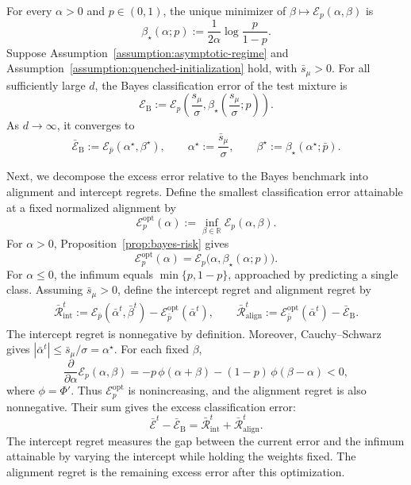 \begin{proposition}
\label{prop:bayes-risk}
For every $\alpha>0$ and $p\in(0,1)$, the unique minimizer of
$\beta\mapsto\mathcal E_p(\alpha,\beta)$ is
\begin{equation}
    \beta_\star(\alpha;p)
    :=
    \frac{1}{2\alpha}\log\frac{p}{1-p}.
    \label{eq:classification-optimal-normalized-intercept}
\end{equation}
Suppose
Assumption~\ref{assumption:asymptotic-regime}
and Assumption~\ref{assumption:quenched-initialization} hold,
with $\bar s_\mu>0$.
For all sufficiently large $d$, the Bayes classification
error of the test mixture is
\[
    \mathcal E_{\mathrm B}
    :=
    \mathcal E_p\left(
        \frac{s_\mu}{\sigma},
        \beta_\star\left(\frac{s_\mu}{\sigma};p\right)
    \right).
\]
As $d\to\infty$, it converges to
\begin{equation}
    \bar{\mathcal E}_{\mathrm B}
    :=
    \mathcal E_{\bar p}(\alpha^\star,\beta^\star),
    \qquad
    \alpha^\star
    :=
    \frac{\bar s_\mu}{\sigma},
    \qquad
    \beta^\star
    :=
    \beta_\star(\alpha^\star;\bar p).
    \label{eq:bayes-classification-error}
\end{equation}
\end{proposition}
Next, we decompose the excess error
relative to the Bayes benchmark into alignment and intercept
regrets.
Define the smallest classification error attainable at a fixed
normalized alignment by
\[
    \mathcal E_p^{\mathrm{opt}}(\alpha)
    :=
    \inf_{\beta\in\mathbb R}
        \mathcal E_p(\alpha,\beta).
\]
For $\alpha>0$, Proposition~\ref{prop:bayes-risk} gives
\[
    \mathcal E_p^{\mathrm{opt}}(\alpha)
    =
    \mathcal E_p\bigl(\alpha,\beta_\star(\alpha;p)\bigr).
\]
For $\alpha\leq0$, the infimum equals $\min\{p,1-p\}$,
approached by predicting a single class.
Assuming $\bar s_\mu>0$, define the intercept regret and
alignment regret by
\begin{align}
    \bar{\mathcal R}_{\mathrm{int}}^t
    :=
    \mathcal E_{\bar p}(\bar\alpha^t,\bar\beta^t)
    -
    \mathcal E_{\bar p}^{\mathrm{opt}}(\bar\alpha^t),
    \qquad
    \bar{\mathcal R}_{\mathrm{align}}^t
    :=
    \mathcal E_{\bar p}^{\mathrm{opt}}(\bar\alpha^t)
    -
    \bar{\mathcal E}_{\mathrm B}.
    \label{eq:classification-regret-decomposition}
\end{align}
The intercept regret is nonnegative by definition.
Moreover, Cauchy--Schwarz gives
$|\bar\alpha^t|\leq\bar s_\mu/\sigma=\alpha^\star$.
For each fixed $\beta$,
\[
    \frac{\partial}{\partial\alpha}
        \mathcal E_p(\alpha,\beta)
    =
    -p\,\phi(\alpha+\beta)
    -(1-p)\,\phi(\beta-\alpha)
    <0,
\]
where $\phi=\Phi'$.
Thus $\mathcal E_p^{\mathrm{opt}}$ is nonincreasing, and
the alignment regret is also nonnegative.
Their sum gives the excess classification error:
\[
    \bar{\mathcal E}^t-\bar{\mathcal E}_{\mathrm B}
    =
    \bar{\mathcal R}_{\mathrm{int}}^t
    +
    \bar{\mathcal R}_{\mathrm{align}}^t.
\]
The intercept regret measures the gap between the current error
and the infimum attainable by varying the intercept while
holding the weights fixed.
The alignment regret is the remaining excess error after this
optimization.

